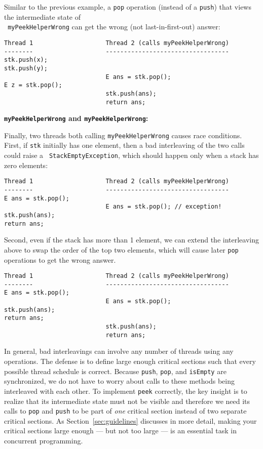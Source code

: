\documentclass[10pt]{article}
\begin{document}
Similar to the previous example, a {\tt pop} operation (instead of a
{\tt push}) that views the intermediate state of\\ {\tt
  myPeekHelperWrong} can get the wrong (not last-in-first-out) answer:
\begin{verbatim}
Thread 1                    Thread 2 (calls myPeekHelperWrong)
--------                    ----------------------------------
stk.push(x);
stk.push(y);
                            E ans = stk.pop();
E z = stk.pop();
                            stk.push(ans);
                            return ans;
\end{verbatim}

\medskip
\noindent\textbf{{\tt myPeekHelperWrong} and {\tt myPeekHelperWrong}:}
\medskip

Finally, two threads both calling {\tt myPeekHelperWrong} causes race
conditions.  First, if {\tt stk} initially has one element, then
a bad interleaving of the two calls could raise a {\tt
  StackEmptyException}, which should happen only when a stack has zero
elements:
\begin{verbatim}
Thread 1                    Thread 2 (calls myPeekHelperWrong)
--------                    ----------------------------------
E ans = stk.pop();
                            E ans = stk.pop(); // exception!
stk.push(ans);
return ans;
\end{verbatim}
Second, even if the stack has more than 1 element, we can extend the
interleaving above to swap the order of the top two elements, which
will cause later {\tt pop} operations to get the wrong answer.
\begin{verbatim}
Thread 1                    Thread 2 (calls myPeekHelperWrong)
--------                    ----------------------------------
E ans = stk.pop();
                            E ans = stk.pop();
stk.push(ans);
return ans;
                            stk.push(ans);
                            return ans;
\end{verbatim}

\bigskip

In general, bad interleavings can involve any number of threads using
any operations.  The defense is to define large enough critical
sections such that every possible thread schedule is correct.  Because
{\tt push}, {\tt pop}, and {\tt isEmpty} are synchronized, we do not
have to worry about calls to these methods being interleaved with each
other.  To implement {\tt peek} correctly, the key insight is to
realize that its intermediate state must not be visible and therefore
we need its calls to {\tt pop} and {\tt push} to be part of \emph{one}
critical section instead of two separate critical sections.  As
Section~\ref{sec:guidelines} discusses in more detail, making your
critical sections large enough --- but not too large --- is an
essential task in concurrent programming.
\end{document}
